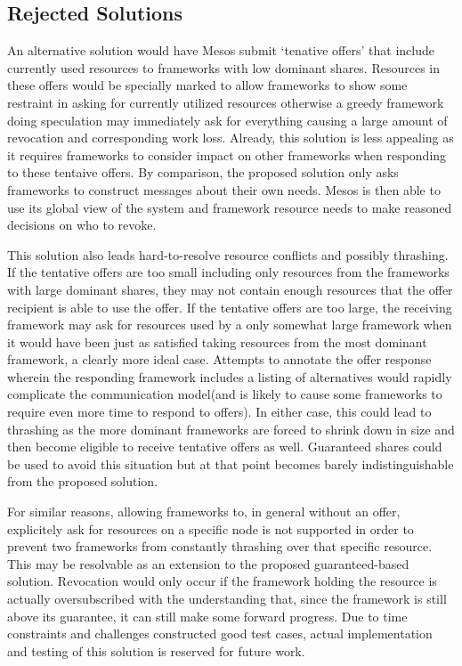 \subsection{Rejected Solutions}
An alternative solution would have Mesos submit `tenative offers' that include currently used
resources to frameworks with low dominant shares. Resources in these offers would be specially
marked to allow frameworks to show some restraint in asking for currently utilized resources
otherwise a greedy framework doing speculation may immediately ask for everything causing a
large amount of revocation and corresponding work loss.  Already, this solution is less
appealing as it requires frameworks to consider impact on other frameworks when responding to
these tentaive offers. By comparison, the proposed solution only asks frameworks to construct
messages about their own needs. Mesos is then able to use its global view of the system and
framework resource needs to make reasoned decisions on who to revoke.

This solution also leads hard-to-resolve resource conflicts and possibly thrashing. If the tentative
offers are too small including only resources from the frameworks with large dominant shares,
they may not contain enough resources that the offer recipient is able to use the offer. If the
tentative offers are too large, the receiving framework may ask for resources used by a only
somewhat large framework when it would have been just as satisfied taking resources from the
most dominant framework, a clearly more ideal case. Attempts to annotate the offer response
wherein the responding framework includes a listing of alternatives would rapidly complicate
the communication model(and is likely to cause some frameworks to require even more time to
respond to offers). In either case, this could lead to thrashing as the more dominant
frameworks are forced to shrink down in size and then become eligible to receive tentative
offers as well. Guaranteed shares could be used to avoid this situation but at that point
becomes barely indistinguishable from the proposed solution.

For similar reasons, allowing frameworks to, in general without an offer, explicitely ask for
resources on a specific node is not supported in order to prevent two frameworks from
constantly thrashing over that specific resource. This may be resolvable as an extension to the
proposed guaranteed-based solution. Revocation would only occur if the framework holding the
resource is actually oversubscribed with the understanding that, since the framework is still
above its guarantee, it can still make some forward progress. Due to time constraints and
challenges constructed good test cases, actual implementation and testing of this solution is
reserved for future work.


